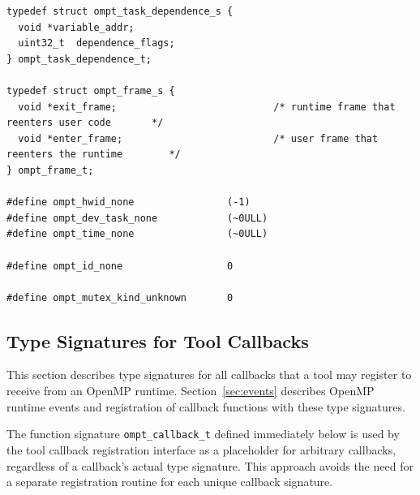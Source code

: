 \documentclass{article}
\begin{document}
\begin{verbatim}
typedef struct ompt_task_dependence_s {
  void *variable_addr;
  uint32_t  dependence_flags;
} ompt_task_dependence_t;

typedef struct ompt_frame_s {
  void *exit_frame;                           /* runtime frame that reenters user code       */
  void *enter_frame;                          /* user frame that reenters the runtime        */
} ompt_frame_t;

#define ompt_hwid_none                (-1)
#define ompt_dev_task_none            (~0ULL)
#define ompt_time_none                (~0ULL)

#define ompt_id_none                  0

#define ompt_mutex_kind_unknown       0
\end{verbatim}
\clearpage

\subsection{Type Signatures for Tool Callbacks}
\label{appendix:ompt-types:callbacks}
This section describes type signatures for all  callbacks that a tool may register to receive from an OpenMP runtime. Section~\ref{sec:events} describes OpenMP runtime events and registration of
callback functions with these type signatures.

The function signature  \verb|ompt_callback_t| defined immediately below is used by the tool callback registration interface as a placeholder for arbitrary callbacks,
 regardless of a callback's actual type signature. This approach avoids the need for a separate registration routine for each unique callback signature. 
\end{document}
